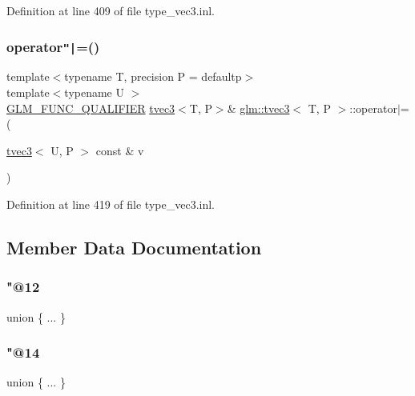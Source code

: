 Definition at line 409 of file type\+\_\+vec3.\+inl.

\mbox{\label{structglm_1_1tvec3_ad176614ebae121c5efbb4a28c29080ef}} 
\subsubsection{\texorpdfstring{operator\texttt{"|}=()}{operator|=()}\hspace{0.1cm}{\footnotesize\ttfamily [6/6]}}
{\footnotesize\ttfamily template$<$typename T, precision P = defaultp$>$ \\
template$<$typename U $>$ \\
\mbox{\hyperlink{setup_8hpp_a33fdea6f91c5f834105f7415e2a64407}{G\+L\+M\+\_\+\+F\+U\+N\+C\+\_\+\+Q\+U\+A\+L\+I\+F\+I\+ER}} \mbox{\hyperlink{structglm_1_1tvec3}{tvec3}}$<$T, P$>$\& \mbox{\hyperlink{structglm_1_1tvec3}{glm\+::tvec3}}$<$ T, P $>$\+::operator$\vert$= (\begin{DoxyParamCaption}\item[{\mbox{\hyperlink{structglm_1_1tvec3}{tvec3}}$<$ U, P $>$ const \&}]{v }\end{DoxyParamCaption})}



Definition at line 419 of file type\+\_\+vec3.\+inl.



\subsection{Member Data Documentation}
\mbox{\label{structglm_1_1tvec3_ae7d0b54c228fb0d5995000a87e9d1faf}} 
\subsubsection{\texorpdfstring{"@12}{@12}}
{\footnotesize\ttfamily union \{ ... \} }

\mbox{\label{structglm_1_1tvec3_a588d350931584d02c0acf07da95ce572}} 
\subsubsection{\texorpdfstring{"@14}{@14}}
{\footnotesize\ttfamily union \{ ... \} }

